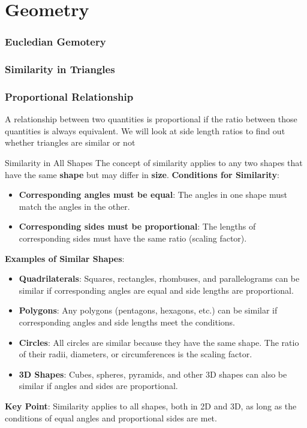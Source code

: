 \documentclass{beamer}
\begin{document}
\section{ Geometry}

\begin{frame}
    \frametitle{Eucledian Gemotery}
\end{frame}

\begin{frame}
    \frametitle{Similarity in Triangles}
\end{frame}



\begin{frame}
    \frametitle{Proportional Relationship}
    A relationship between two quantities is proportional if the ratio between those quantities is always equivalent. We will look at side length ratios to find out whether triangles are similar or not
\end{frame}

\begin{frame}{Similarity in All Shapes}
  The concept of similarity applies to any two shapes that have the same \textbf{shape} but may differ in \textbf{size}.
    \vspace{10pt}
    \textbf{Conditions for Similarity}:
    \begin{itemize}
        \item \textbf{Corresponding angles must be equal}: The angles in one shape must match the angles in the other.
        \item \textbf{Corresponding sides must be proportional}: The lengths of corresponding sides must have the same ratio (scaling factor).
    \end{itemize}
\end{frame}

\begin{frame}
    \vspace{10pt}
    \textbf{Examples of Similar Shapes}:
    \begin{itemize}
        \item \textbf{Quadrilaterals}: Squares, rectangles, rhombuses, and parallelograms can be similar if corresponding angles are equal and side lengths are proportional.
        \item \textbf{Polygons}: Any polygons (pentagons, hexagons, etc.) can be similar if corresponding angles and side lengths meet the conditions.
        \item \textbf{Circles}: All circles are similar because they have the same shape. The ratio of their radii, diameters, or circumferences is the scaling factor.
        \item \textbf{3D Shapes}: Cubes, spheres, pyramids, and other 3D shapes can also be similar if angles and sides are proportional.
    \end{itemize}

    \vspace{10pt}
    \textbf{Key Point}: Similarity applies to all shapes, both in 2D and 3D, as long as the conditions of equal angles and proportional sides are met.
\end{frame}
\end{document}

